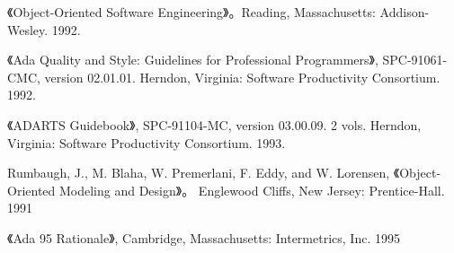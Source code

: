 \begin{thebibliography}{widest-label}
 《Object-Oriented Software
Engineering》。Reading, Massachusetts: Addison-Wesley. 1992.

 《Ada Quality and Style: Guidelines
for Professional Programmers》, SPC-91061-CMC, version 02.01.01.
Herndon, Virginia: Software Productivity Consortium. 1992.

 《ADARTS Guidebook》, SPC-91104-MC,
version 03.00.09. 2 vols. Herndon, Virginia: Software Productivity Consortium.
1993.

 Rumbaugh, J., M. Blaha, W. Premerlani, F. Eddy, and W. Lorensen, 《Object-Oriented Modeling and Design》。
Englewood Cliffs, New Jersey: Prentice-Hall. 1991

 《Ada 95 Rationale》, Cambridge,
Massachusetts: Intermetrics, Inc. 1995

\end{thebibliography}
